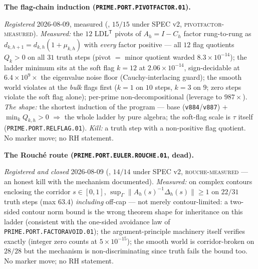 \documentclass[11pt,a4paper]{article}
\begin{document}
\par\smallskip\noindent\textbf{The flag-chain induction
(\texttt{PRIME.PORT.\allowbreak PIVOTFACTOR.01}).}
{\sloppy
\emph{Registered} 2026-08-09, measured
(, $15/15$ under SPEC v2,
\textsc{pivotfactor-measured}).  \emph{Measured:} the $12$
LDL$^{\mathsf T}$ pivots of $A_h = I - C_h$ factor
rung-to-rung as $d_{k,h+1} = d_{k,h}(1 + \mu_{k,h})$ with
\emph{every} factor positive --- all $12$ flag quotients $Q_k
> 0$ on all $31$ truth steps (pivot $=$ minor quotient warded
$8.3\times10^{-14}$); the ladder minimum sits at the soft flag
$k = 12$ at $2.06\times10^{-14}$, sign-decidable at
$6.4\times10^{9}\times$ the eigenvalue noise floor
(Cauchy-interlacing guard); the smooth world violates at the
\emph{bulk} flags first ($k = 1$ on $10$ steps, $k = 3$ on
$9$; zero steps violate the soft flag alone); per-prime
non-decompositional (leverage to $987\times$).  \emph{The
shape:} the shortest induction of the program --- base
(\texttt{v884}/\texttt{v887}) $+$ $\min_k Q_{k,h} > 0$
$\Rightarrow$ the whole ladder by pure algebra; the soft-flag
scale is $\tau$ itself (\texttt{PRIME.PORT.RELFLAG.01}).
\emph{Kill:} a truth step with a non-positive flag quotient.
No marker move; no RH statement.\par}

\par\smallskip\noindent\textbf{The Rouch\'e route
(\texttt{PRIME.PORT.EULER.\allowbreak ROUCHE.01}, dead).}
{\sloppy
\emph{Registered and closed} 2026-08-09
(, $14/14$ under SPEC v2,
\textsc{rouche-measured} --- an honest kill with the mechanism
documented).  \emph{Measured:} on complex contours enclosing
the corridor $s \in [0, 1]$, $\sup_\Gamma
\|A_h(s)^{-1}\Delta_h(s)\| \ge 1$ on $22/31$ truth steps (max
$63.4$) \emph{including} off-cap --- not merely
contour-limited: a two-sided contour norm bound is the wrong
theorem shape for inheritance on this ladder (consistent with
the one-sided avoidance law of
\texttt{PRIME.PORT.FACTORAVOID.01}); the argument-principle
machinery itself verifies exactly (integer zero counts at
$5\times10^{-15}$); the smooth world is corridor-broken on
$28/28$ but the mechanism is non-discriminating since truth
fails the bound too.  No marker move; no RH statement.\par}
\end{document}
